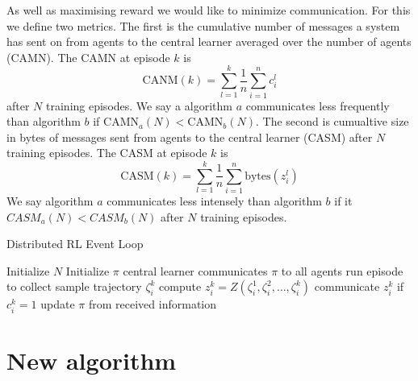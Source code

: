 As well as maximising reward we would like to minimize communication. For this we define two metrics. The first is the cumulative number of messages a system has sent on from agents to the central learner averaged over the number of agents (CAMN). The CAMN at episode $k$  is
\begin{equation*}
    \text{CANM}(k) = \sum_{l=1}^k \frac{1}{n} \sum_{i=1}^n c_i^l
\end{equation*} 
after $N$ training episodes. We say a algorithm $a$ communicates less frequently than algorithm $b$ if $\text{CAMN}_a(N) < \text{CAMN}_b(N)$. The second is cumualtive size in bytes of messages sent from agents to the central learner (CASM) after $N$ training episodes. The CASM at episode $k$ is 
\begin{equation*}
    \text{CASM}(k) = \sum_{l=1}^k \frac{1}{n} \sum_{i=1}^n \text{bytes}(z_i^l)
\end{equation*}  
We say algorithm $a$ communicates less intensely than algorithm $b$ if it $CASM_a(N) < CASM_b(N)$ after $N$ training episodes.


\begin{algorithm}
        \caption{Distributed RL Event Loop}\label{alg:EventLoop}
        \begin{algorithmic}
                \State Initialize $N$ 
                \State Initialize $\pi$
                \State central learner communicates $\pi$ to all agents
                \State run episode to collect sample trajectory $\zeta^k_i$ %
                \State compute $z^k_i = Z(\zeta^1_i,\zeta^2_i,\dots, \zeta^k_i)$
                \State communicate $z^k_i$ if $c^k_i = 1$
                \EndFor
                \State update $\pi$ from received information
                \EndFor
        \end{algorithmic}
\end{algorithm}

\section{New algorithm}
